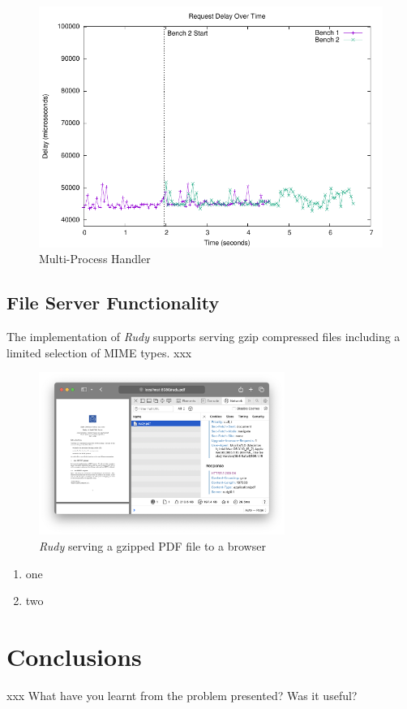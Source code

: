 \documentclass[a4paper, 11pt]{article}
\begin{document}
\begin{figure}[H]
  \begin{center}
    \includegraphics{graphs/requests-multi-process/requests.pdf}
    \caption{Multi-Process Handler}
    \label{fig:results2}
  \end{center}
\end{figure}

\subsection{File Server Functionality}
The implementation of \textit{Rudy} supports serving gzip compressed files including a limited selection of MIME types. xxx
\begin{figure}[H]
  \begin{center}
    \includegraphics[height=200px]{graphs/browser/pdf-gzip.png}
    \caption{\textit{Rudy} serving a gzipped PDF file to a browser}
    \label{fig:browser1}
  \end{center}
\end{figure}

\begin{enumerate}
\item one
\item two
\end{enumerate}

\section{Conclusions}

xxx What have you learnt from the problem presented? Was it useful?
\end{document}
